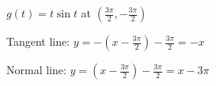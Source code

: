 {$g(t) = t\sin t$ at $(\frac{3\pi}{2},-\frac{3\pi}{2})$
}
{Tangent line: $y = -(x-\frac{3\pi}{2}) - \frac{3\pi}{2} = -x$

Normal line: $y = (x-\frac{3\pi}{2}) - \frac{3\pi}{2} = x-3\pi$
}
